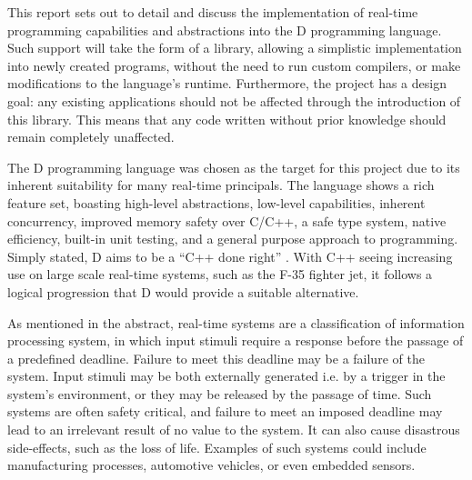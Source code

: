 






This report sets out to detail and discuss the implementation of real-time 
programming capabilities and abstractions into the D programming language. 
Such support will take the form of a library, allowing a simplistic implementation 
into newly created programs, without the need to run custom compilers, or make 
modifications to the language's runtime. Furthermore, the project has a design 
goal: any existing applications should not be affected through the introduction 
of this library. This means that any code written without prior knowledge should 
remain completely unaffected. 
\par\bigskip\noindent
The D programming language was chosen as the target for this project due to its 
inherent suitability for many real-time principals. The language shows a rich 
feature set, boasting high-level abstractions, low-level capabilities, inherent 
concurrency, improved memory safety over C/C++, a safe type 
system, native efficiency, built-in unit testing,  and a general purpose approach 
to programming. Simply stated, D aims to be a ``C++ done right'' \cite{qznc-tutorial}. 
With C++ seeing increasing use on large scale real-time systems, such as the F-35 
fighter jet, it follows a logical progression that D would provide a suitable 
alternative.
\par\bigskip\noindent
As mentioned in the abstract, real-time systems are a classification of 
information processing system, in which input
stimuli require a response before the passage of a predefined deadline. Failure 
to meet this deadline may be a failure of the system. Input 
stimuli may be both externally generated i.e. by a trigger in the system's 
environment, or they may be released by the passage of time. Such systems are 
often safety critical, and failure to meet an imposed deadline may lead to 
an irrelevant result of no value to the system. It can also cause disastrous side-effects, 
such as the loss of life. Examples of such systems could include 
manufacturing processes, automotive vehicles, or even embedded sensors. 

